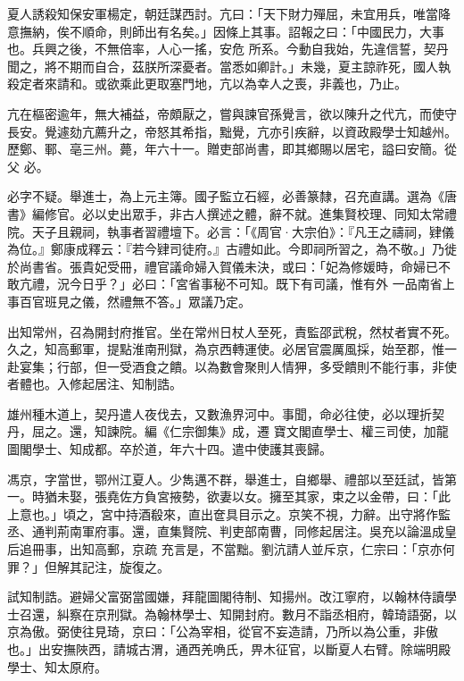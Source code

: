 \begin{pinyinscope}
 夏人誘殺知保安軍楊定，朝廷謀西討。亢曰：「天下財力殫屈，未宜用兵，唯當降意撫納，俟不順命，則師出有名矣。」因條上其事。詔報之曰：「中國民力，大事也。兵興之後，不無倍率，人心一搖，安危
 所系。今動自我始，先違信誓，契丹聞之，將不期而自合，茲朕所深憂者。當悉如卿計。」未幾，夏主諒祚死，國人執殺定者來請和。或欲乘此更取塞門地，亢以為幸人之喪，非義也，乃止。



 亢在樞密逾年，無大補益，帝頗厭之，嘗與諫官孫覺言，欲以陳升之代亢，而使守長安。覺遽劾亢薦升之，帝怒其希指，黜覺，亢亦引疾辭，以資政殿學士知越州。歷鄭、鄆、亳三州。薨，年六十一。贈吏部尚書，即其鄉賜以居宅，謚曰安簡。從父
 必。



 必字不疑。舉進士，為上元主簿。國子監立石經，必善篆隸，召充直講。選為《唐書》編修官。必以史出眾手，非古人撰述之體，辭不就。進集賢校理、同知太常禮院。天子且親祠，執事者習禮壇下。必言：「《周官·大宗伯》：『凡王之禱祠，肄儀為位。』鄭康成釋云：『若今肄司徒府。』古禮如此。今即祠所習之，為不敬。」乃徙於尚書省。張貴妃受冊，禮官議命婦入賀儀未決，或曰：「妃為修媛時，命婦已不敢亢禮，況今日乎？」必曰：「宮省事秘不可知。既下有司議，惟有外
 一品南省上事百官班見之儀，然禮無不答。」眾議乃定。



 出知常州，召為開封府推官。坐在常州日杖人至死，責監邵武稅，然杖者實不死。久之，知高郵軍，提點淮南刑獄，為京西轉運使。必居官震厲風採，始至郡，惟一赴宴集；行部，但一受酒食之饋。以為數會聚則人情狎，多受饋則不能行事，非使者體也。入修起居注、知制誥。



 雄州種木道上，契丹遣人夜伐去，又數漁界河中。事聞，命必往使，必以理折契丹，屈之。還，知諫院。編《仁宗御集》成，遷
 寶文閣直學士、權三司使，加龍圖閣學士、知成都。卒於道，年六十四。遣中使護其喪歸。



 馮京，字當世，鄂州江夏人。少雋邁不群，舉進士，自鄉舉、禮部以至廷試，皆第一。時猶未娶，張堯佐方負宮掖勢，欲妻以女。擁至其家，束之以金帶，曰：「此上意也。」頃之，宮中持酒殽來，直出奩具目示之。京笑不視，力辭。出守將作監丞、通判荊南軍府事。還，直集賢院、判吏部南曹，同修起居注。吳充以論溫成皇后追冊事，出知高郵，京疏
 充言是，不當黜。劉沆請人並斥京，仁宗曰：「京亦何罪？」但解其記注，旋復之。



 試知制誥。避婦父富弼當國嫌，拜龍圖閣待制、知揚州。改江寧府，以翰林侍讀學士召還，糾察在京刑獄。為翰林學士、知開封府。數月不詣丞相府，韓琦語弼，以京為傲。弼使往見琦，京曰：「公為宰相，從官不妄造請，乃所以為公重，非傲也。」出安撫陜西，請城古渭，通西羌唃氏，畀木征官，以斷夏人右臂。除端明殿學士、知太原府。




\end{pinyinscope}
